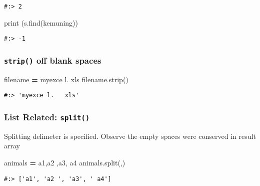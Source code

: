\documentclass[
]{book}
\newenvironment{Shaded}{\begin{snugshade}}{\end{snugshade}}
\newcommand{\BuiltInTok}[1]{#1}
\newcommand{\NormalTok}[1]{#1}
\newcommand{\OperatorTok}[1]{\textcolor[rgb]{0.43,0.43,0.43}{\textbf{#1}}}
\newcommand{\StringTok}[1]{\textcolor[rgb]{0.5,0.5,0.5}{#1}}
\begin{document}
\begin{verbatim}
#:> 2
\end{verbatim}

\begin{Shaded}
\begin{Highlighting}[]
\BuiltInTok{print}\NormalTok{ (s.find(}\StringTok{\textquotesingle{}kemuning\textquotesingle{}}\NormalTok{))}
\end{Highlighting}
\end{Shaded}

\begin{verbatim}
#:> -1
\end{verbatim}

\hypertarget{strip-off-blank-spaces}{%
\subsubsection{\texorpdfstring{\texttt{strip()} off blank spaces}{strip() off blank spaces}}\label{strip-off-blank-spaces}}

\begin{Shaded}
\begin{Highlighting}[]
\NormalTok{filename }\OperatorTok{=} \StringTok{\textquotesingle{}  myexce l.   xls   \textquotesingle{}}
\NormalTok{filename.strip()}
\end{Highlighting}
\end{Shaded}

\begin{verbatim}
#:> 'myexce l.   xls'
\end{verbatim}

\hypertarget{list-related-split}{%
\subsubsection{\texorpdfstring{List Related: \texttt{split()}}{List Related: split()}}\label{list-related-split}}

Splitting delimeter is specified. Observe the empty spaces were conserved in result array

\begin{Shaded}
\begin{Highlighting}[]
\NormalTok{animals }\OperatorTok{=} \StringTok{\textquotesingle{}a1,a2 ,a3, a4\textquotesingle{}}
\NormalTok{animals.split(}\StringTok{\textquotesingle{},\textquotesingle{}}\NormalTok{)}
\end{Highlighting}
\end{Shaded}

\begin{verbatim}
#:> ['a1', 'a2 ', 'a3', ' a4']
\end{verbatim}
\end{document}
